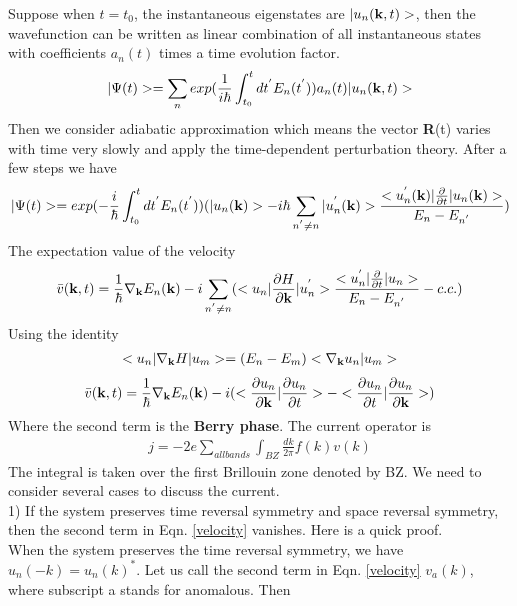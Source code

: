 \documentclass[a4paper]{article}
\begin{document}
Suppose when $t= t_0$, the instantaneous eigenstates are $|u_n({\bf k}, t)>$, then
the wavefunction can be written as linear combination of all instantaneous states with coefficients $a_n(t)$ times a time evolution factor.  
\begin{align*}
	|\Psi(t)> = \sum_n exp(\frac{1}{i\hbar} \int_{t_0}^t dt^{'} E_n(t^{'})) a_n(t) |u_n({\bf k}, t)>
\end{align*}
Then we consider adiabatic approximation which means the vector {\bf R}(t) varies with time very slowly and apply the time-dependent perturbation theory. After a few steps we have
\begin{align*}
	|\Psi(t)>= exp(-\frac{i}{\hbar}\int_{t_0}^{t} dt^{'} E_{n}(t^{'}))(|u_n({\bf k})> 
	-i\hbar \sum_{n^{'}\neq n} |u_n^{'}({\bf k})>\frac{<u_n^{'}({\bf k})|\frac{\partial}{\partial t}|u_n({\bf k})>}{E_{n} - E_{n^{'}}})
\end{align*}
The expectation value of the velocity
\begin{align*}
	\bar v({\bf k},t) = \frac{1}{\hbar} \nabla_{\bf k} E_n({\bf k}) 
	- i \sum_{n^{'}\neq n} (<u_n|\frac{\partial H}{\partial {\bf k}}|u_n^{'}>\frac{<u_n^{'}|\frac{\partial}{\partial t}|u_n>}{E_{n} - E_{n^{'}}} - c.c.)
\end{align*}
Using the identity
\begin{align*}
	<u_n|\nabla_{\bf k} H | u_m> = (E_n - E_m) < \nabla_{\bf k} u_n| u_m>
\end{align*}
\begin{align}\label{velocity}
	\bar v({\bf k},t) = \frac{1}{\hbar} \nabla_{\bf k} E_n({\bf k}) 
	- i  (<\frac{\partial u_n}{\partial {\bf k}}| \frac{\partial u_n}{\partial t}> -<\frac{\partial u_n}{\partial t}| \frac{\partial u_n}{\partial {\bf k}}>)
\end{align}
Where the second term is the {\bf Berry phase}.
The current operator is
\begin{align*}
	j = -2e\sum_{all bands}\int_{BZ}\frac{dk}{2 \pi} f(k)v(k)
\end{align*}
The integral is taken over the first Brillouin zone denoted by BZ.
We need to consider several cases to discuss the current.\\
1) If the system preserves time reversal symmetry and space reversal symmetry, then the second term in Eqn. \ref{velocity} vanishes. Here is a quick proof.\\
When the system preserves the time reversal symmetry, we have $u_n(-k) = u_n(k)^{*}$. Let us call the second term in Eqn. \ref{velocity} $v_a(k)$, where subscript a stands for anomalous. Then
\end{document}
